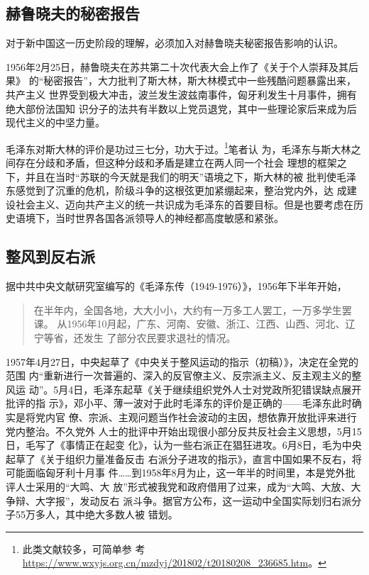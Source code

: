 \subsection{赫鲁晓夫的秘密报告}

对于新中国这一历史阶段的理解，必须加入对赫鲁晓夫秘密报告影响的认识。

1956年2月25日，赫鲁晓夫在苏共第二十次代表大会上作了《关于个人崇拜及其后果》
的“秘密报告”，大力批判了斯大林，斯大林模式中一些残酷问题暴露出来，共产主义
世界受到极大冲击，波兰发生波兹南事件，匈牙利发生十月事件，拥有绝大部份法国知
识分子的法共有半数以上党员退党，其中一些理论家后来成为后现代主义的中坚力量。

毛泽东对斯大林的评价是功过三七分，功大于过。\footnote{此类文献较多，可简单参
  考\url{https://www.wxyjs.org.cn/mzdyj/201802/t20180208_236685.htm}。}笔者认
为，毛泽东与斯大林之间存在分歧和矛盾，但这种分歧和矛盾是建立在两人同一个社会
理想的框架之下，并且在当时“苏联的今天就是我们的明天”语境之下，斯大林的被
批判使毛泽东感觉到了沉重的危机，阶级斗争的这根弦更加紧绷起来，整治党内外，达
成建设社会主义、迈向共产主义的统一共识成为毛泽东的首要目标。但是也要考虑在历
史语境下，当时世界各国各派领导人的神经都高度敏感和紧张。

\subsection{整风到反右派}

据中共中央文献研究室编写的《毛泽东传（1949-1976）》，1956年下半年开始，
\begin{quotation}
  在半年内，全国各地，大大小小，大约有一万多工人罢工，一万多学生罢课。
  从1956年10月起，广东、河南、安徽、浙江、江西、山西、河北、辽宁等省，还发生
  了部分农民要求退社的情况。
\end{quotation}

1957年4月27日，中央起草了《中央关于整风运动的指示（初稿）》，决定在全党的范围
内“重新进行一次普遍的、深入的反官僚主义、反宗派主义、反主观主义的整风运
动”。5月4日，毛泽东起草《关于继续组织党外人士对党政所犯错误缺点展开批评的指
示》，邓小平、薄一波对于此时毛泽东的评价是正确的——毛泽东此时确实是将党内官
僚、宗派、主观问题当作社会波动的主因，想依靠开放批评来进行党内整治。不久党外
人士的批评中开始出现很小部分反共反社会主义思想，5月15日，毛写了《事情正在起变
化》，认为一些右派正在猖狂进攻。6月8日，毛为中央起草了《关于组织力量准备反击
右派分子进攻的指示》，直言中国如果不反右，将可能面临匈牙利十月事
件……到1958年8月为止，这一年半的时间里，本是党外批评人士采用的“大鸣、大
放”形式被我党和政府借用了过来，成为“大鸣、大放、大争辩、大字报”，发动反右
派斗争。据官方公布，这一运动中全国实际划归右派分子55万多人，其中绝大多数人被
错划。


